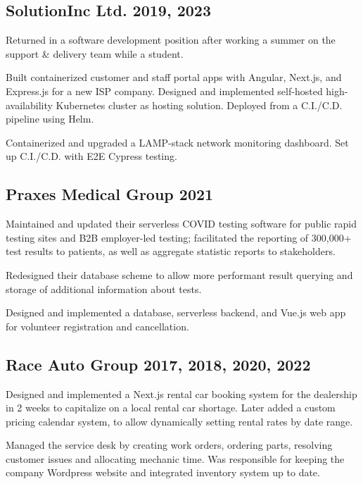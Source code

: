 \documentclass[letter,10pt]{article}
\begin{document}
\subsection{{SolutionInc Ltd. \hfill 2019, 2023}}
\begin{zitemize}
\item Returned in a software development position after working a summer on the support \& delivery team while a student.
\item Built containerized customer and staff portal apps with Angular, Next.js, and Express.js for a new ISP company. Designed and implemented self-hosted high-availability Kubernetes cluster as hosting solution. Deployed from a C.I./C.D. pipeline using Helm.
\item Containerized and upgraded a LAMP-stack network monitoring dashboard. Set up C.I./C.D. with E2E Cypress testing.
\end{zitemize}

\subsection{{Praxes Medical Group \hfill 2021}}
\begin{zitemize}
\item Maintained and updated their serverless COVID testing software for public rapid testing sites and B2B employer-led testing; facilitated the reporting of 300,000+ test results to patients, as well as aggregate statistic reports to stakeholders.
\item Redesigned their database scheme to allow more performant result querying and storage of additional information about tests.
\item Designed and implemented a database, serverless backend, and Vue.js web app for volunteer registration and cancellation.
\end{zitemize}

\subsection{{Race Auto Group \hfill 2017, 2018, 2020, 2022}}
\begin{zitemize}
\item Designed and implemented a Next.js rental car booking system for the dealership in 2 weeks to capitalize on a local rental car shortage. Later added a custom pricing calendar system, to allow dynamically setting rental rates by date range.
\item Managed the service desk by creating work orders, ordering parts, resolving customer issues and allocating mechanic time. Was responsible for keeping the company Wordpress website and integrated inventory system up to date.
\end{zitemize}
\end{document}
